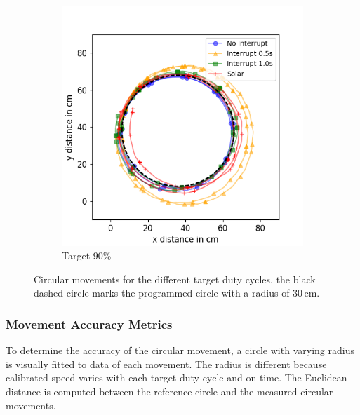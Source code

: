 \begin{figure}[h!]
	\begin{subfigure}[b]{0.49\textwidth}
		\includegraphics[width=\textwidth]{pics/circle_90.png}
		\caption{Target 90\%}
		\label{fig:circ_exp3}
	\end{subfigure}
	\caption{Circular movements for the different target duty cycles, the black dashed circle marks the programmed circle with a radius of 30\,cm.}
	\label{fig:circular_movements}
\end{figure}

\subsubsection{Movement Accuracy Metrics}

To determine the accuracy of the circular movement, a circle with varying radius is visually fitted to data of each movement.
The radius is different because calibrated speed varies with each target duty cycle and on time.
The Euclidean distance is computed between the reference circle and the measured circular movements.


